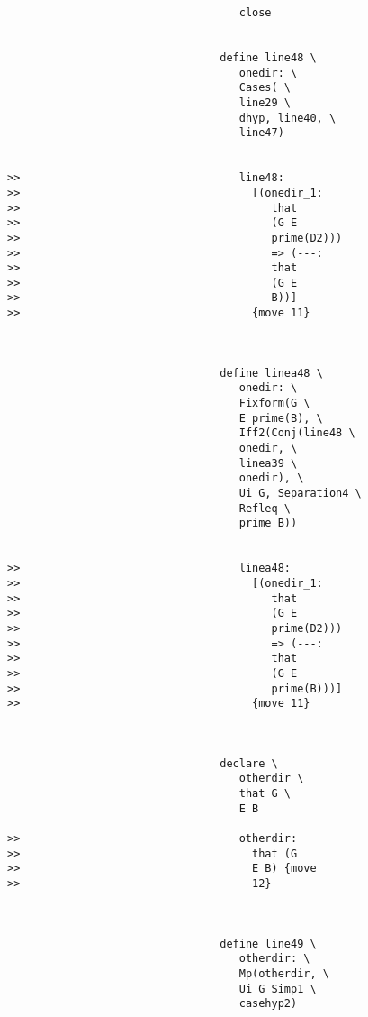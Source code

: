 \documentclass[12pt]{article}
\begin{document}
\begin{verbatim}
                                    close


                                 define line48 \
                                    onedir: \
                                    Cases( \
                                    line29 \
                                    dhyp, line40, \
                                    line47)


>>                                  line48:
>>                                    [(onedir_1:
>>                                       that
>>                                       (G E
>>                                       prime(D2)))
>>                                       => (---:
>>                                       that
>>                                       (G E
>>                                       B))]
>>                                    {move 11}



                                 define linea48 \
                                    onedir: \
                                    Fixform(G \
                                    E prime(B), \
                                    Iff2(Conj(line48 \
                                    onedir, \
                                    linea39 \
                                    onedir), \
                                    Ui G, Separation4 \
                                    Refleq \
                                    prime B))


>>                                  linea48:
>>                                    [(onedir_1:
>>                                       that
>>                                       (G E
>>                                       prime(D2)))
>>                                       => (---:
>>                                       that
>>                                       (G E
>>                                       prime(B)))]
>>                                    {move 11}



                                 declare \
                                    otherdir \
                                    that G \
                                    E B

>>                                  otherdir:
>>                                    that (G
>>                                    E B) {move
>>                                    12}



                                 define line49 \
                                    otherdir: \
                                    Mp(otherdir, \
                                    Ui G Simp1 \
                                    casehyp2)



\end{verbatim}
\end{document}
